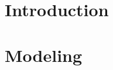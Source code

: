 %
\chapter{Introduction}
\label{chap:sys_describe}
%






\chapter{Modeling}







%

















 
 